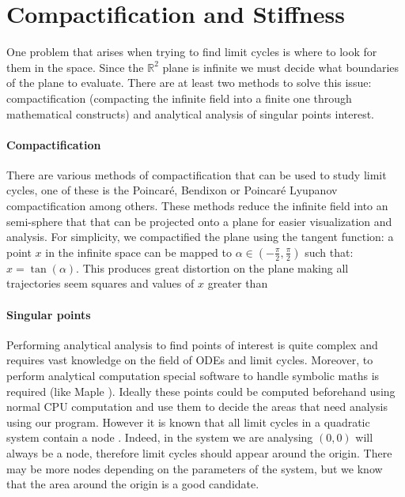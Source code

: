 
\section{Compactification and Stiffness}%
\label{sec:compact-stiff}

One problem that arises when trying to find limit cycles is where to look for them in the space. Since the $\mathbb{R}^2$ plane is infinite we must decide what boundaries of the plane to evaluate. There are at least two methods to solve this issue: compactification (compacting the infinite field into a finite one through mathematical constructs) and analytical analysis of singular points interest.

\paragraph{Compactification}
There are various methods of compactification that can be used to study limit cycles, one of these is the Poincaré, Bendixon or Poincaré Lyupanov compactification \cite{poincare_sur_1891,bendixson_sur_1901,dumortier_poincare_2006,noauthor_fig_nodate} among others. These methods reduce the infinite field into an semi-sphere that that can be projected onto a plane for easier visualization and analysis. For simplicity, we compactified the plane using the tangent function: a point $x$ in the infinite space can be mapped to $\alpha \in \left(-\frac{\pi}{2}, \frac{\pi}{2}\right)$ such that: $x = \tan(\alpha)$. This produces great distortion on the plane making all trajectories seem squares and values of $x$ greater than

\paragraph{Singular points}
Performing analytical analysis to find points of interest is quite complex and requires vast knowledge on the field of ODEs and limit cycles. Moreover, to perform analytical computation special software to handle symbolic maths is required (like Maple \cite{noauthor_maple_nodate}). Ideally these points could be computed beforehand using normal CPU computation and use them to decide the areas that need analysis using our program. However it is known that all limit cycles in a quadratic system contain a node \cite{cherkas_quadratic_2003}. Indeed, in the system we are analysing $(0,0)$ will always be a node, therefore limit cycles should appear around the origin. There may be more nodes depending on the parameters of the system, but we know that the area around the origin is a good candidate.

